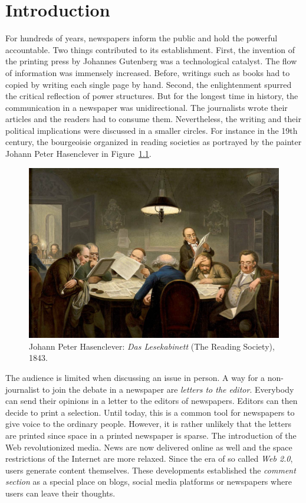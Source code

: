 \chapter{Introduction}

For hundreds of years, newspapers inform the public and hold the powerful accountable. Two things contributed to its establishment. First, the invention of the printing press by Johannes Gutenberg was a technological catalyst. The flow of information was immensely increased. Before, writings such as books had to copied by writing each single page by hand. Second, the enlightenment spurred the critical reflection of power structures. But for the longest time in history, the communication in a newspaper was unidirectional. The journalists wrote their articles and the readers had to consume them. Nevertheless, the writing and their political implications were discussed in a smaller circles. For instance in the 19th century, the bourgeoisie organized in reading societies as portrayed by the painter Johann Peter Hasenclever in Figure~\ref{fig:lesegesel}.

\begin{figure}[h]
	\includegraphics[width=1\textwidth]{images/intro/Lesegesellschaft.png}
	\caption[Caption for LOF]{Johann Peter Hasenclever: \textit{Das Lesekabinett} (The Reading Society), 1843.\protect\footnotemark}
	\label{fig:lesegesel}
\end{figure}


The audience is limited when discussing an issue in person. A way for a non-journalist to join the debate in a newspaper are \textit{letters to the editor}. Everybody can send their opinions in a letter to the editors of newspapers. Editors can then decide to print a selection. Until today, this is a common tool for newspapers to give voice to the ordinary people. However, it is rather unlikely that the letters are printed since space in a printed newspaper is sparse.
The introduction of the Web revolutionized media. News are now delivered online as well and the space restrictions of the Internet are more relaxed.
Since the era of so called \textit{Web 2.0}, users generate content themselves.
These developments established the \textit{comment section} as a special place on blogs, social media platforms or newspapers where users can leave their thoughts.

